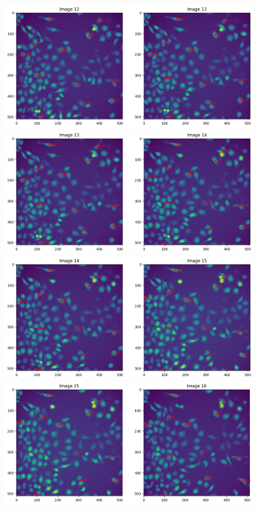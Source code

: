 \documentclass{article}
\begin{document}
\begin{figure}[h!]
\centering
\includegraphics[width=0.75\linewidth]{Report/RImages/Traces_Control/image_13a.png}
\includegraphics[width=0.75\linewidth]{Report/RImages/Traces_Control/image_14a.png}
\includegraphics[width=0.75\linewidth]{Report/RImages/Traces_Control/image_15a.png}
\includegraphics[width=0.75\linewidth]{Report/RImages/Traces_Control/image_16a.png}
\end{figure}
\clearpage
\end{document}
